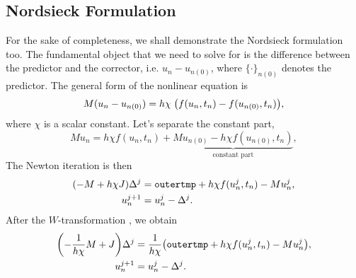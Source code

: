 \documentclass[a4paper,9pt]{article}
\theoremstyle{definition}
\theoremstyle{remark}
\begin{document}
\subsection{Nordsieck Formulation}
For the sake of completeness, we shall demonstrate the Nordsieck formulation
too. The fundamental object that we need to solve for is the difference between
the predictor and the corrector, i.e. $u_n - u_{n(0)}$, where $\{\cdot\}_{n(0)}$
denotes the predictor. The general form
of the nonlinear equation is
\begin{equation}
  M (u_n - u_{n(0)}) = h\chi \; \qty(f(u_n, t_n) - f(u_{n(0)}, t_n)),
\end{equation}
where $\chi$ is a scalar constant.
Let's separate the constant part,
\begin{equation}
  M u_n = h\chi f(u_n, t_n) + \underbrace{M u_{n(0)} - h\chi f(u_{n(0)},
  t_n)}_\text{constant part},
\end{equation}
The Newton iteration is then
\begin{align}
  \qty(-M + h\chi J) \Delta^j &= \texttt{outertmp} + h\chi f(u^j_n, t_n) - M
  u^j_n, \\
  u^{j+1}_n &= u^j_n - \Delta^j.
\end{align}
After the $W$-transformation \cite[Chapter~IV.5]{hairer2010solving}, we obtain
\begin{align} \label{eq:newton_nord}
  \qty(-\frac{1}{h\chi}M + J) \Delta^j &= \frac{1}{h\chi}\qty(\texttt{outertmp} + h\chi f(u^j_n, t_n) - M
  u^j_n), \\
  u^{j+1}_n &= u^j_n - \Delta^j.
\end{align}



\end{document}
